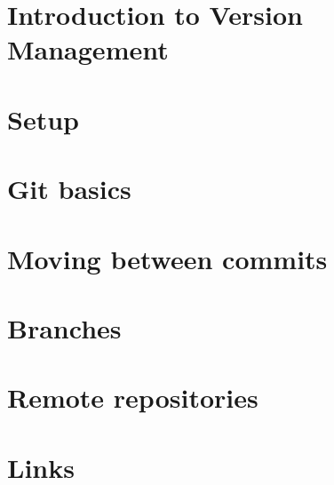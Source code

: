 \documentclass[b5paper,openany]{book}
\begin{document}
\tp


\tableofcontents



\chapter{Introduction to Version Management}


\chapter{Setup}


\chapter{Git basics}


\chapter{Moving between commits}


\chapter{Branches}


\chapter{Remote repositories}


\chapter{Links}





\end{document}
